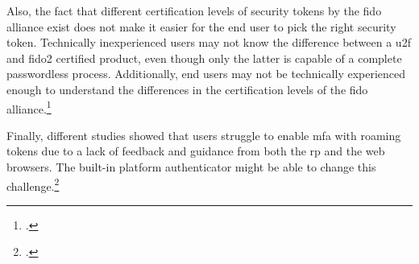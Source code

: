 Also, the fact that different certification levels of security tokens by the \gls{fido} alliance exist does not make it easier for the end user to pick the right security token. Technically inexperienced users may not know the difference between a \gls{u2f} and \gls{fido}2 certified product, even though only the latter is capable of a complete passwordless process. Additionally, end users may not be technically experienced enough to understand the differences in the certification levels of the \gls{fido} alliance.\footcites[See][]{fido-certification}

Finally, different studies showed that users struggle to enable \gls{mfa} with roaming tokens due to a lack of feedback and guidance from both the \gls{rp} and the web browsers. The built-in platform authenticator might be able to change this challenge.\footcites[See][]{8418643}[See][884]{usabaility-u2f}[See][15]{das2018johnny}